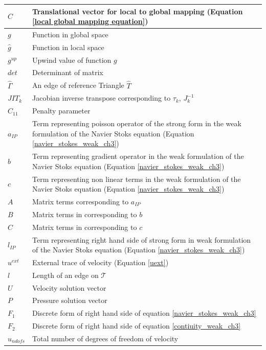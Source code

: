 \documentclass[a4paper,twoside,openright]{book}
\begin{document}
\begin{longtable}{| p{} | p{} |}
\hline
$C$ & Translational vector for local to global mapping (Equation \eqref{local global mapping equation})\\
\hline
$g$ & Function in global space \\
\hline
$\hat{g}$ & Function in local space \\
\hline
$g^{up}$ & Upwind value of function $g$\\
\hline
$det$ & Determinant of matrix \\
\hline
$\hat{\Gamma}$ & An edge of reference Triangle $\hat{T}$\\
\hline
$JIT_k$ & Jacobian inverse transpose corresponding to $\tau_k$, $J_k^{-1}$\\
\hline
$C_{11}$ & Penalty parameter \\
\hline
$a_{IP}$ & Term representing poisson operator of the strong form in the weak formulation of the Navier Stoks equation (Equation \eqref{navier_stokes_weak_ch3}) \\
\hline
$b$ & Term representing gradient operator in the weak formulation of the Navier Stoks equation (Equation \eqref{navier_stokes_weak_ch3})\\
\hline
$c$ & Term representing non linear terms in the weak formulation of the Navier Stoks equation (Equation \eqref{navier_stokes_weak_ch3})\\
\hline
$A$ & Matrix terms corresponding to $a_{IP}$\\
\hline
$B$ & Matrix terms in corresponding to $b$\\
\hline
$C$ & Matrix terms in corresponding to $c$\\
\hline
$l_{IP}$ & Term representing right hand side of strong form in weak formulation of the Navier Stoks equation (Equation \eqref{navier_stokes_weak_ch3}) \\
\hline
$u^{ext}$ & External trace of velocity (Equation \eqref{uext})\\
\hline
$l$ & Length of an edge on $\mathcal{T}$\\
\hline
$U$ & Velocity solution vector \\
\hline
$P$ & Pressure solution vector\\
\hline
$F_1$ & Discrete form of right hand side of equation \eqref{navier_stokes_weak_ch3}\\
\hline
$F_2$ & Discrete form of right hand side of equation \eqref{contiuity_weak_ch3}\\
\hline
$u_{ndofs}$ & Total number of degrees of freedom of velocity\\
\hline

\end{longtable}
\end{document}
